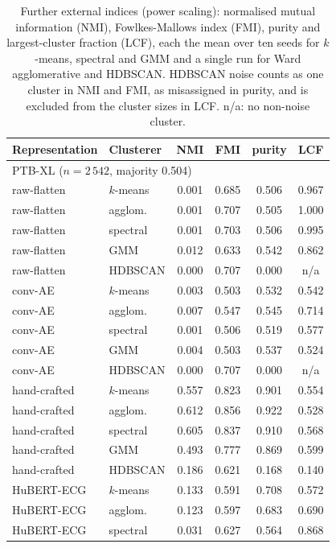 \documentclass[preprint,11pt]{elsarticle}
\begin{document}
\begin{table}[ht]
\centering
\footnotesize
\caption{Further external indices (power scaling): normalised mutual information (NMI),
Fowlkes-Mallows index (FMI), purity and largest-cluster fraction (LCF), each the mean
over ten seeds for $k$-means, spectral and GMM and a single run for Ward agglomerative and
HDBSCAN. HDBSCAN noise counts as one cluster in NMI and FMI, as misassigned in purity, and
is excluded from the cluster sizes in LCF. n/a: no non-noise cluster.}
\label{tab:extra}
\begin{tabular}{llcccc}
\toprule
Representation & Clusterer & NMI & FMI & purity & LCF \\
\midrule
\multicolumn{6}{l}{PTB-XL ($n = 2\,542$, majority 0.504)} \\
raw-flatten  & $k$-means & 0.001 & 0.685 & 0.506 & 0.967 \\
raw-flatten  & agglom.   & 0.001 & 0.707 & 0.505 & 1.000 \\
raw-flatten  & spectral  & 0.001 & 0.703 & 0.506 & 0.995 \\
raw-flatten  & GMM       & 0.012 & 0.633 & 0.542 & 0.862 \\
raw-flatten  & HDBSCAN   & 0.000 & 0.707 & 0.000 & n/a \\
conv-AE      & $k$-means & 0.003 & 0.503 & 0.532 & 0.542 \\
conv-AE      & agglom.   & 0.007 & 0.547 & 0.545 & 0.714 \\
conv-AE      & spectral  & 0.001 & 0.506 & 0.519 & 0.577 \\
conv-AE      & GMM       & 0.004 & 0.503 & 0.537 & 0.524 \\
conv-AE      & HDBSCAN   & 0.000 & 0.707 & 0.000 & n/a \\
hand-crafted & $k$-means & 0.557 & 0.823 & 0.901 & 0.554 \\
hand-crafted & agglom.   & 0.612 & 0.856 & 0.922 & 0.528 \\
hand-crafted & spectral  & 0.605 & 0.837 & 0.910 & 0.568 \\
hand-crafted & GMM       & 0.493 & 0.777 & 0.869 & 0.599 \\
hand-crafted & HDBSCAN   & 0.186 & 0.621 & 0.168 & 0.140 \\
HuBERT-ECG   & $k$-means & 0.133 & 0.591 & 0.708 & 0.572 \\
HuBERT-ECG   & agglom.   & 0.123 & 0.597 & 0.683 & 0.690 \\
HuBERT-ECG   & spectral  & 0.031 & 0.627 & 0.564 & 0.868 \\

\end{tabular}
\end{table}
\end{document}

